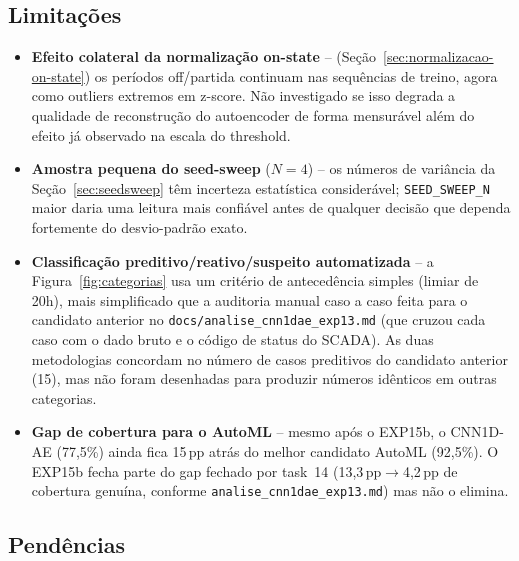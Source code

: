 \documentclass[11pt,a4paper]{article}
\begin{document}
\subsection{Limitações}

\begin{itemize}[leftmargin=1.4em]
  \item \textbf{Efeito colateral da normalização on-state} --
    (Seção~\ref{sec:normalizacao-on-state}) os períodos off/partida
    continuam nas sequências de treino, agora como outliers extremos em
    z-score. Não investigado se isso degrada a qualidade de
    reconstrução do autoencoder de forma mensurável além do efeito já
    observado na escala do threshold.
  \item \textbf{Amostra pequena do seed-sweep} ($N=4$) -- os números de
    variância da Seção~\ref{sec:seedsweep} têm incerteza estatística
    considerável; \texttt{SEED\_SWEEP\_N} maior daria uma leitura mais
    confiável antes de qualquer decisão que dependa fortemente do
    desvio-padrão exato.
  \item \textbf{Classificação preditivo/reativo/suspeito automatizada} --
    a Figura~\ref{fig:categorias} usa um critério de antecedência
    simples (limiar de 20h), mais simplificado que a auditoria manual
    caso a caso feita para o candidato anterior no
    \texttt{docs/analise\_cnn1dae\_exp13.md} (que cruzou cada caso com
    o dado bruto e o código de status do SCADA). As duas metodologias
    concordam no número de casos preditivos do candidato anterior (15),
    mas não foram desenhadas para produzir números idênticos em outras
    categorias.
  \item \textbf{Gap de cobertura para o AutoML} -- mesmo após o EXP15b,
    o CNN1D-AE (77,5\%) ainda fica 15\,pp atrás do melhor candidato
    AutoML (92,5\%). O EXP15b fecha parte do gap fechado por task~14
    (13,3\,pp$\to$4,2\,pp de cobertura genuína, conforme
    \texttt{analise\_cnn1dae\_exp13.md}) mas não o elimina.
\end{itemize}

\subsection{Pendências}
\end{document}
